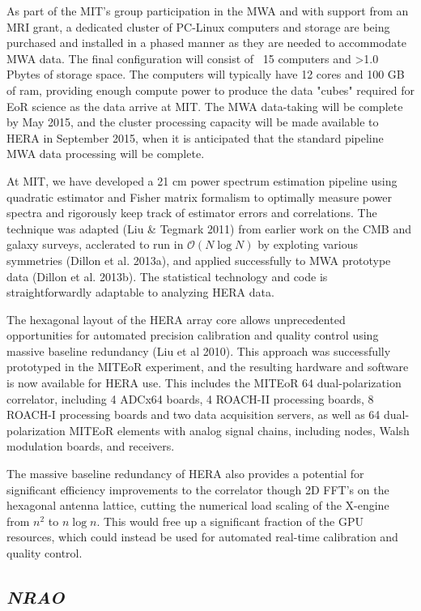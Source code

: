 \documentclass[11pt]{article}
\begin{document}
As part of the MIT's group participation in the MWA and with support from an MRI grant, a dedicated cluster of PC-Linux computers and storage are being purchased and installed in a phased manner as they are needed to accommodate MWA data. The final configuration will consist of ~15 computers and >1.0 Pbytes of storage space. The computers will typically have 12 cores and 100 GB of ram, providing enough compute power to produce the data "cubes" required for EoR science as the data arrive at MIT. The MWA data-taking will be complete by May 2015, and the cluster processing capacity will be made available to HERA in September 2015, when it is anticipated that the standard pipeline MWA data processing will be complete.

At MIT, we have developed a 21 cm power spectrum estimation pipeline using quadratic estimator and Fisher matrix formalism to optimally measure power spectra and rigorously keep track of estimator errors and correlations.  The technique was adapted (Liu \& Tegmark 2011) from earlier work on the CMB and galaxy surveys, acclerated to run in $\mathcal{O}(N\log N)$ by exploting various symmetries (Dillon et al. 2013a), and applied successfully to MWA prototype data (Dillon et al. 2013b). The statistical technology and code is straightforwardly adaptable to analyzing HERA data.

The hexagonal layout of the HERA array core allows unprecedented opportunities for automated precision calibration and quality control using massive baseline redundancy (Liu et al 2010). This approach was successfully prototyped in the MITEoR experiment, and the resulting hardware and software is now available for HERA use. This includes the MITEoR 64 dual-polarization correlator, including 4 ADCx64 boards, 4 ROACH-II processing boards, 8 ROACH-I processing boards and two data acquisition servers, as well as 64 dual-polarization MITEoR elements with analog signal chains, including nodes, Walsh modulation boards, and receivers.

The massive baseline redundancy of HERA also provides a potential for significant efficiency improvements to the correlator though 2D FFT's on the hexagonal antenna lattice, cutting the numerical load scaling of the X-engine from $n^2$ to $n \log n$. This would free up a significant fraction of the GPU resources, which could instead be used for automated real-time calibration and quality control.


\subsection*{\it NRAO} 
\end{document}
